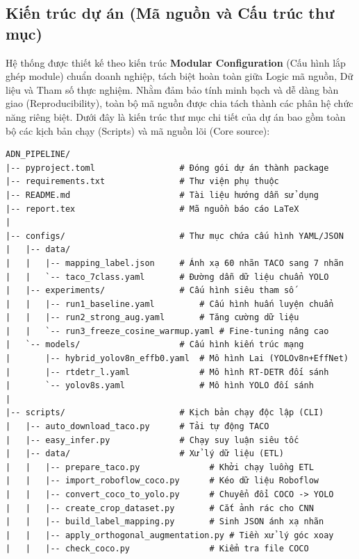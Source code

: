 \documentclass[12pt, a4paper]{article}
\begin{document}
\subsection{Kiến trúc dự án (Mã nguồn và Cấu trúc thư mục)}
Hệ thống được thiết kế theo kiến trúc \textbf{Modular Configuration} (Cấu hình lắp ghép module) chuẩn doanh nghiệp, tách biệt hoàn toàn giữa Logic mã nguồn, Dữ liệu và Tham số thực nghiệm. Nhằm đảm bảo tính minh bạch và dễ dàng bàn giao (Reproducibility), toàn bộ mã nguồn được chia tách thành các phân hệ chức năng riêng biệt. 
Dưới đây là kiến trúc thư mục chi tiết của dự án bao gồm toàn bộ các kịch bản chạy (Scripts) và mã nguồn lõi (Core source):

\begin{tcolorbox}[colback=gray!5!white, colframe=gray!50!black, title=Cấu trúc cây thư mục chi tiết dự án ADN\_pipeline, breakable]
\footnotesize
\begin{verbatim}
ADN_PIPELINE/
|-- pyproject.toml                 # Đóng gói dự án thành package
|-- requirements.txt               # Thư viện phụ thuộc
|-- README.md                      # Tài liệu hướng dẫn sử dụng
|-- report.tex                     # Mã nguồn báo cáo LaTeX
|
|-- configs/                       # Thư mục chứa cấu hình YAML/JSON
|   |-- data/                      
|   |   |-- mapping_label.json     # Ánh xạ 60 nhãn TACO sang 7 nhãn
|   |   `-- taco_7class.yaml       # Đường dẫn dữ liệu chuẩn YOLO
|   |-- experiments/               # Cấu hình siêu tham số
|   |   |-- run1_baseline.yaml         # Cấu hình huấn luyện chuẩn
|   |   |-- run2_strong_aug.yaml       # Tăng cường dữ liệu
|   |   `-- run3_freeze_cosine_warmup.yaml # Fine-tuning nâng cao
|   `-- models/                    # Cấu hình kiến trúc mạng
|       |-- hybrid_yolov8n_effb0.yaml  # Mô hình Lai (YOLOv8n+EffNet)
|       |-- rtdetr_l.yaml              # Mô hình RT-DETR đối sánh
|       `-- yolov8s.yaml               # Mô hình YOLO đối sánh
|
|-- scripts/                       # Kịch bản chạy độc lập (CLI)
|   |-- auto_download_taco.py      # Tải tự động TACO
|   |-- easy_infer.py              # Chạy suy luận siêu tốc
|   |-- data/                      # Xử lý dữ liệu (ETL)
|   |   |-- prepare_taco.py              # Khởi chạy luồng ETL
|   |   |-- import_roboflow_coco.py      # Kéo dữ liệu Roboflow
|   |   |-- convert_coco_to_yolo.py      # Chuyển đổi COCO -> YOLO
|   |   |-- create_crop_dataset.py       # Cắt ảnh rác cho CNN
|   |   |-- build_label_mapping.py       # Sinh JSON ánh xạ nhãn
|   |   |-- apply_orthogonal_augmentation.py # Tiền xử lý góc xoay
|   |   |-- check_coco.py                # Kiểm tra file COCO

\end{verbatim}
\end{tcolorbox}
\end{document}
